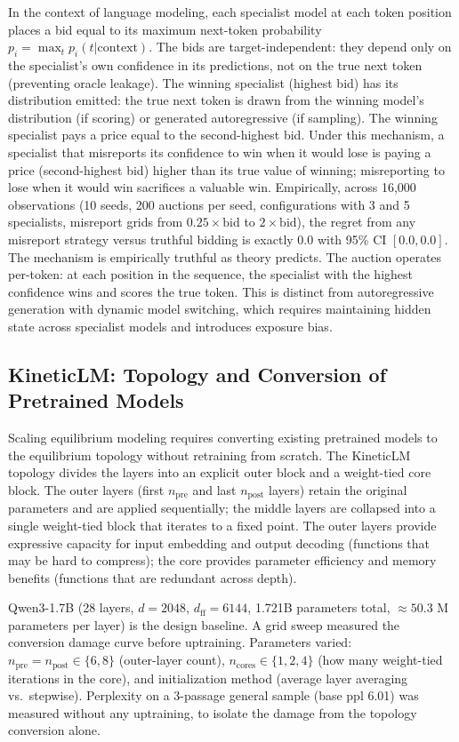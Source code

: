 In the context of language modeling, each specialist model at each token position places a bid equal to its maximum next-token probability $p_i = \max_t p_i(t | \text{context})$. The bids are target-independent: they depend only on the specialist's own confidence in its predictions, not on the true next token (preventing oracle leakage). The winning specialist (highest bid) has its distribution emitted: the true next token is drawn from the winning model's distribution (if scoring) or generated autoregressive (if sampling). The winning specialist pays a price equal to the second-highest bid. Under this mechanism, a specialist that misreports its confidence to win when it would lose is paying a price (second-highest bid) higher than its true value of winning; misreporting to lose when it would win sacrifices a valuable win. Empirically, across 16,000 observations (10 seeds, 200 auctions per seed, configurations with 3 and 5 specialists, misreport grids from $0.25 \times \text{bid}$ to $2 \times \text{bid}$), the regret from any misreport strategy versus truthful bidding is exactly $0.0$ with 95\% CI $[0.0, 0.0]$. The mechanism is empirically truthful as theory predicts. The auction operates per-token: at each position in the sequence, the specialist with the highest confidence wins and scores the true token. This is distinct from autoregressive generation with dynamic model switching, which requires maintaining hidden state across specialist models and introduces exposure bias.

\subsection*{KineticLM: Topology and Conversion of Pretrained Models}

Scaling equilibrium modeling requires converting existing pretrained models to the equilibrium topology without retraining from scratch. The KineticLM topology divides the layers into an explicit outer block and a weight-tied core block. The outer layers (first $n_\text{pre}$ and last $n_\text{post}$ layers) retain the original parameters and are applied sequentially; the middle layers are collapsed into a single weight-tied block that iterates to a fixed point. The outer layers provide expressive capacity for input embedding and output decoding (functions that may be hard to compress); the core provides parameter efficiency and memory benefits (functions that are redundant across depth).

Qwen3-1.7B (28 layers, $d = 2048$, $d_\text{ff} = 6144$, 1.721B parameters total, $\approx 50.3$ M parameters per layer) is the design baseline. A grid sweep measured the conversion damage curve before uptraining. Parameters varied: $n_\text{pre} = n_\text{post} \in \{6, 8\}$ (outer-layer count), $n_\text{cores} \in \{1, 2, 4\}$ (how many weight-tied iterations in the core), and initialization method (average layer averaging vs.\ stepwise). Perplexity on a 3-passage general sample (base ppl 6.01) was measured without any uptraining, to isolate the damage from the topology conversion alone.

